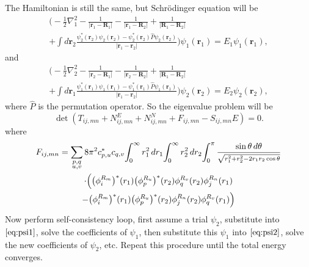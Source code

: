 \documentclass[12pt]{article}
\begin{document}
The Hamiltonian is still the same, but Schr\"{o}dinger equation will be
\begin{multline}\label{eq:psi1}
    \bigg(- \frac{1}{2}\nabla_1^2
    - \frac{1}{\lvert \symbf{r}_1 - \symbf{R}_1 \rvert}
    - \frac{1}{\lvert \symbf{r}_1 - \symbf{R}_2 \rvert}
    + \frac{1}{\lvert \symbf{R}_1 -
        \symbf{R}_2 \rvert}\\
    + \int d\symbf{r}_2
    \frac{ \psi_2 ^\ast  (\symbf{r}_2) \psi_2(\symbf{r}_2) - \psi_2 ^\ast  (\symbf{r}_2) \hat{P} \psi_2(\symbf{r}_2)}%
    {\lvert \symbf{r}_1 - \symbf{r}_2 \rvert}
    \bigg) \psi_1(\symbf{r}_1)
    = E_1  \psi_1(\symbf{r}_1),
\end{multline}
and
\begin{multline}\label{eq:psi2}
    \bigg(- \frac{1}{2}\nabla_2^2
    - \frac{1}{\lvert \symbf{r}_2 - \symbf{R}_1 \rvert}
    - \frac{1}{\lvert \symbf{r}_2 - \symbf{R}_2 \rvert}
    + \frac{1}{\lvert \symbf{R}_1 -
        \symbf{R}_2 \rvert}\\
    + \int d\symbf{r}_1
    \frac{ \psi_1 ^\ast  (\symbf{r}_1) \psi_1(\symbf{r}_1) - \psi_1 ^\ast  (\symbf{r}_1) \hat{P} \psi_1(\symbf{r}_1)}%
    {\lvert \symbf{r}_1 - \symbf{r}_2 \rvert}
    \bigg) \psi_2(\symbf{r}_2)
    = E_2  \psi_2(\symbf{r}_2),
\end{multline}
where $\hat{P}$ is the permutation operator.
So the eigenvalue problem will be
\begin{equation}
    \det(T_{ij, mn} + N^E_{ij, mn} + N^N_{ij, mn} + F_{ij, mn} - S_{ij, mn} E ) = 0.
\end{equation}
where
\begin{multline}
    F_{ij, mn} = \sum_{\substack{p, q\\u, v}} 8\pi^2 c_{p, u}^\ast c_{q, v}
    \!\int_{0}^{\infty} r_1^2  \, dr_1
    \!\int_{0}^{\infty} r_2^2 \, dr_2
    \!\int_{0}^{\pi}
    \frac{ \sin\theta \, d\theta}{ \mathsmaller{\sqrt{r_1^2 + r_2^2 - 2 r_1 r_2 \cos\theta}} }\\
    \cdot \Big(
    \big( \phi_i^{R_m} \big)^\ast(r_1) \big(\phi_p^{R_u} \big)^\ast(r_2) %
    \phi_q^{R_v}(r_2)\phi_j^{R_n}(r_1)\\
    -  \big( \phi_i^{R_m} \big)^\ast(r_1) \big(\phi_p^{R_u} \big)^\ast(r_2) %
    \phi_j^{R_n}(r_2)\phi_q^{R_v}(r_1)
    \Big)
\end{multline}
Now perform self-consistency loop, first assume a trial $\psi_2$, substitute into
$\eqref{eq:psi1}$, solve the coefficients of $\psi_1$, then substitute this $\psi_1$
into $\eqref{eq:psi2}$, solve the new coefficients of $\psi_2$, etc. Repeat this procedure
until the total energy converges.
\end{document}
